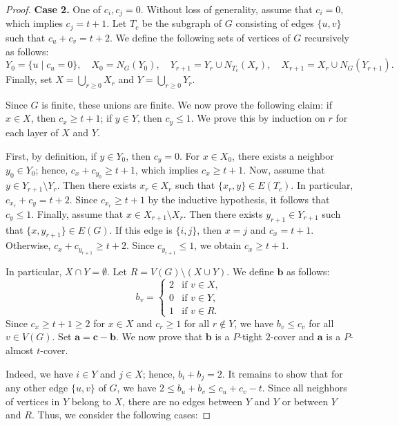 \documentclass[12pt,amscd]{amsart}
\theoremstyle{definition}
\numberwithin{equation}{section}
\begin{document}
\begin{proof}
\medskip 

\noindent\textbf{Case 2.} One of $c_i, c_j = 0$. Without loss of generality, assume that $c_i = 0$, which implies $c_j = t+1$. Let $T_c$ be the subgraph of $G$ consisting of edges $\{u,v\}$ such that $c_u + c_v = t+2$. We define the following sets of vertices of $G$ recursively as follows:
\[
Y_0 = \{ u \mid c_u = 0 \}, \quad X_0 = N_G(Y_0), \quad Y_{r+1} = Y_r \cup N_{T_c}(X_r), \quad X_{r+1} = X_r \cup N_G(Y_{r+1}).
\]
Finally, set $X = \bigcup_{r \ge 0} X_r$ and $Y = \bigcup_{r \ge 0} Y_r$.

Since $G$ is finite, these unions are finite. We now prove the following claim: if $x \in X$, then $c_x \ge t+1$; if $y \in Y$, then $c_y \le 1$. We prove this by induction on $r$ for each layer of $X$ and $Y$.

First, by definition, if $y \in Y_0$, then $c_y = 0$. For $x \in X_0$, there exists a neighbor $y_0 \in Y_0$; hence, $c_x + c_{y_0} \ge t+1$, which implies $c_x \ge t+1$. Now, assume that $y \in Y_{r+1} \setminus Y_r$. Then there exists $x_r \in X_r$ such that $\{x_r, y\} \in E(T_c)$. In particular, $c_{x_r} + c_y = t+2$. Since $c_{x_r} \ge t+1$ by the inductive hypothesis, it follows that $c_y \le 1$. Finally, assume that $x \in X_{r+1} \setminus X_r$. Then there exists $y_{r+1} \in Y_{r+1}$ such that $\{x, y_{r+1}\} \in E(G)$. If this edge is $\{i,j\}$, then $x = j$ and $c_x = t+1$. Otherwise, $c_x + c_{y_{r+1}} \ge t+2$. Since $c_{y_{r+1}} \le 1$, we obtain $c_x \ge t+1$.

In particular, $X \cap Y = \emptyset$. Let $R = V(G) \setminus (X \cup Y)$. We define $\mathbf{b}$ as follows:
\[
b_v = \begin{cases}
    2 & \text{if } v \in X, \\
    0 & \text{if } v \in Y, \\
    1 & \text{if } v \in R.
\end{cases}
\]
Since $c_x \ge t+1 \ge 2$ for $x \in X$ and $c_r \ge 1$ for all $r \notin Y$, we have $b_v \le c_v$ for all $v \in V(G)$. Set $\mathbf{a} = \mathbf{c} - \mathbf{b}$. We now prove that $\mathbf{b}$ is a $P$-tight $2$-cover and $\mathbf{a}$ is a $P$-almost $t$-cover. 

Indeed, we have $i \in Y$ and $j \in X$; hence, $b_i + b_j = 2$. It remains to show that for any other edge $\{u,v\}$ of $G$, we have $2 \le b_u + b_v \le c_u + c_v - t$. Since all neighbors of vertices in $Y$ belong to $X$, there are no edges between $Y$ and $Y$ or between $Y$ and $R$. Thus, we consider the following cases:


\end{proof}
\end{document}
